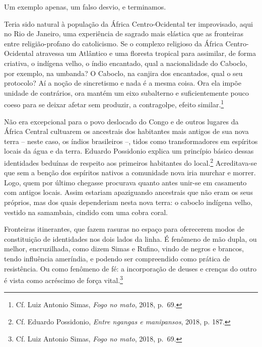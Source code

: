 Um exemplo apenas, um falso desvio, e terminamos.

Teria sido natural à população da África Centro-Ocidental ter
improvisado, aqui no Rio de Janeiro, uma experiência de sagrado mais
elástica que as fronteiras entre religião-profano do catolicismo. Se o
complexo religioso da África Centro-Ocidental atravessa um Atlântico e
uma floresta tropical para assimilar, de forma criativa, o indígena
velho, o índio encantado, qual a nacionalidade do Caboclo, por exemplo,
na umbanda? O Caboclo, na canjira dos encantados, qual o seu protocolo?
Aí a noção de sincretismo e nada é a mesma coisa. Ora ela impõe unidade
de contrários, ora mantém um eixo subalterno e suficientemente pouco
coeso para se deixar afetar sem produzir, a contragolpe, efeito
similar.\footnote{Cf. Luiz Antonio Simas, \emph{Fogo no mato}, 2018,
  p.~69.}

Não era excepcional para o povo deslocado do Congo e de outros lugares
da África Central cultuarem os ancestrais dos habitantes mais antigos de
sua nova terra -- neste caso, os índios brasileiros --, tidos como
transformadores em espíritos locais da água e da terra. Eduardo
Possidonio explica um princípio básico dessas identidades beduínas de
respeito aos primeiros habitantes do local.\footnote{Cf. Eduardo
  Possidonio, \emph{Entre ngangas e manipansos}, 2018, p. 187.}
Acreditava-se que sem a benção dos espíritos nativos a comunidade nova
iria murchar e morrer. Logo, quem por último chegasse procurava quanto
antes unir-se em casamento com antigos locais. Assim estariam
apaziguando ancestrais que não eram os seus próprios, mas dos quais
dependeriam nesta nova terra: o caboclo indígena velho, vestido na
samambaia, cindido com uma cobra coral.

Fronteiras itinerantes, que fazem rasuras no espaço para oferecerem
modos de constituição de identidades nos dois lados da linha. É fenômeno
de mão dupla, ou melhor, encruzilhada, como dizem Simas e Rufino, vindo
de negros e brancos, tendo influência ameríndia, e podendo ser
compreendido como prática de resistência. Ou como fenômeno de fé: a
incorporação de deuses e crenças do outro é vista como acréscimo de
força vital.\footnote{Cf. Luiz Antonio Simas, \emph{Fogo no mato}, 2018,
  p.~69.}

